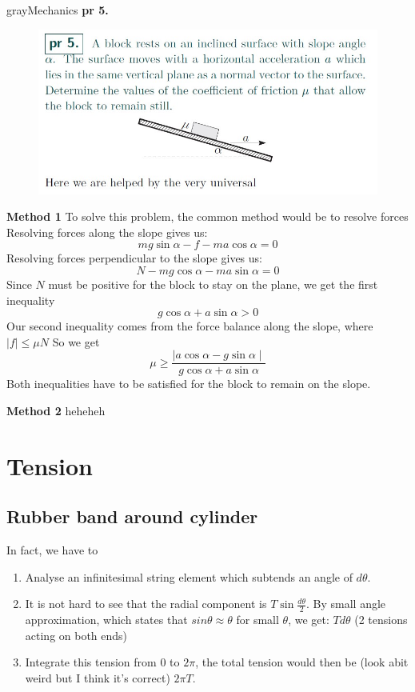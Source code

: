 \documentclass[12pt,a4paper]{extreport}
\numberwithin{equation}{chapter}
\begin{document}
    \begin{mybox}{gray}{Mechanics \textbf{pr 5.}}
        \begin{figure}
            \includegraphics[scale=0.5]{pr 5.jpg} 
        \end{figure}

        \textbf{Method 1} \quad
        To solve this problem, the common method would be to resolve forces
        Resolving forces along the slope gives us: 
        $$mg\sin\alpha-f-ma\cos\alpha=0$$
        Resolving forces perpendicular to the slope gives us: 
        $$N-mg\cos\alpha-ma\sin\alpha=0$$
        Since $N$ must be positive for the block to stay on the plane, we get the first inequality
        $$g\cos\alpha+a\sin\alpha > 0$$
        Our second inequality comes from the force balance along the slope, where $\mid f \mid\leq\mu N$
        So we get
        \begin{equation}
            \mu \geq \frac{\mid a\cos\alpha-g\sin\alpha \mid}{g\cos\alpha+a\sin\alpha}
        \end{equation}
        Both inequalities have to be satisfied for the block to remain on the slope.

        \tcblower
        \textbf{Method 2} \quad heheheh
    \end{mybox}


    
    \section{Tension}
    \subsection{Rubber band around cylinder}
    In fact, we have to 
        \begin{enumerate}
            \item Analyse an infinitesimal string element which subtends an angle of $d\theta$.
            \item It is not hard to see that the radial component is $T\sin\frac{d\theta}{2}$. By small angle approximation, which states that $sin\theta \approx \theta$ for small $\theta$, we get: $Td\theta$ (2 tensions acting on both ends)
            \item Integrate this tension from $0$ to $2 \pi $, the total tension would then be (look abit weird but I think it's correct) $2 \pi T$.
        \end{enumerate}
    
\end{document}

